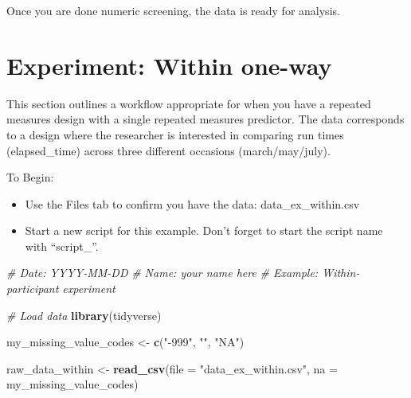 \documentclass[
]{krantz}
\makeatletter
\newenvironment{Shaded}{\begin{snugshade}}{\end{snugshade}}
\newcommand{\CommentTok}[1]{\textcolor[rgb]{0.37,0.37,0.37}{\textit{#1}}}
\newcommand{\DataTypeTok}[1]{\textcolor[rgb]{0.27,0.27,0.27}{#1}}
\newcommand{\DecValTok}[1]{\textcolor[rgb]{0.06,0.06,0.06}{#1}}
\newcommand{\KeywordTok}[1]{\textcolor[rgb]{0.27,0.27,0.27}{\textbf{#1}}}
\newcommand{\NormalTok}[1]{#1}
\newcommand{\OperatorTok}[1]{\textcolor[rgb]{0.43,0.43,0.43}{\textbf{#1}}}
\newcommand{\OtherTok}[1]{\textcolor[rgb]{0.37,0.37,0.37}{#1}}
\newcommand{\StringTok}[1]{\textcolor[rgb]{0.5,0.5,0.5}{#1}}
\newenvironment{kframe}{%
\medskip{}
\setlength{\fboxsep}{.8em}
 \def\at@end@of@kframe{}%
 \ifinner\ifhmode%
  \def\at@end@of@kframe{\end{minipage}}%
  \begin{minipage}{\columnwidth}%
 \fi\fi%
 \def\FrameCommand##1{\hskip\@totalleftmargin \hskip-\fboxsep
 \colorbox{shadecolor}{##1}\hskip-\fboxsep
     \hskip-\linewidth \hskip-\@totalleftmargin \hskip\columnwidth}%
 \MakeFramed {\advance\hsize-\width
   \@totalleftmargin\z@ \linewidth\hsize
   \@setminipage}}%
 {\par\unskip\endMakeFramed%
 \at@end@of@kframe}
\renewenvironment{Shaded}{\begin{kframe}}{\end{kframe}}
\makeatother
\begin{document}
\begin{Shaded}
\end{Shaded}

Once you are done numeric screening, the data is ready for analysis.

\hypertarget{experiment-within-one-way}{%
\section{Experiment: Within one-way}\label{experiment-within-one-way}}

This section outlines a workflow appropriate for when you have a repeated measures design with a single repeated measures predictor. The data corresponds to a design where the researcher is interested in comparing run times (elapsed\_time) across three different occasions (march/may/july).

To Begin:

\begin{itemize}
\item
  Use the Files tab to confirm you have the data: data\_ex\_within.csv
\item
  Start a new script for this example. Don't forget to start the script name with ``script\_''.
\end{itemize}

\begin{Shaded}
\begin{Highlighting}[]
\CommentTok{# Date: YYYY-MM-DD}
\CommentTok{# Name: your name here}
\CommentTok{# Example: Within-participant experiment}

\CommentTok{# Load data}
\KeywordTok{library}\NormalTok{(tidyverse)}

\NormalTok{my_missing_value_codes <-}\StringTok{ }\KeywordTok{c}\NormalTok{(}\StringTok{"-999"}\NormalTok{, }\StringTok{""}\NormalTok{, }\StringTok{"NA"}\NormalTok{)}

\NormalTok{raw_data_within <-}\StringTok{ }\KeywordTok{read_csv}\NormalTok{(}\DataTypeTok{file =} \StringTok{"data_ex_within.csv"}\NormalTok{,}
                     \DataTypeTok{na =}\NormalTok{ my_missing_value_codes)}
\end{Highlighting}
\end{Shaded}
\end{document}
